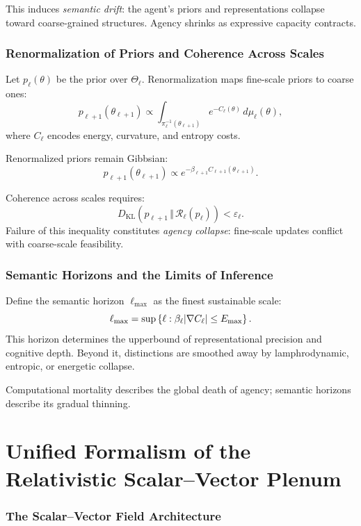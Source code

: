 \documentclass[12pt]{article}
\theoremstyle{plain}
\theoremstyle{definition}
\theoremstyle{remark}
\begin{document}
This induces \emph{semantic drift}: the agent's priors and representations 
collapse toward coarse-grained structures. Agency shrinks as expressive 
capacity contracts.

\section{Renormalization of Priors and Coherence Across Scales}

Let $p_\ell(\theta)$ be the prior over $\Theta_\ell$. Renormalization maps 
fine-scale priors to coarse ones:
\[
p_{\ell+1}(\theta_{\ell+1})
\propto
\int_{\pi_\ell^{-1}(\theta_{\ell+1})}
  e^{-C_\ell(\theta)}\, d\mu_\ell(\theta),
\]
where $C_\ell$ encodes energy, curvature, and entropy costs.

Renormalized priors remain Gibbsian:
\[
p_{\ell+1}(\theta_{\ell+1})
\propto
e^{-\beta_{\ell+1} C_{\ell+1}(\theta_{\ell+1})}.
\]

Coherence across scales requires:
\[
D_{\mathrm{KL}}(
  p_{\ell+1}
  \,\Vert\, 
  \mathcal{R}_\ell(p_\ell)
) < \varepsilon_\ell.
\]
Failure of this inequality constitutes \emph{agency collapse}: fine-scale 
updates conflict with coarse-scale feasibility.

\section{Semantic Horizons and the Limits of Inference}

Define the semantic horizon $\ell_{\max}$ as the finest sustainable scale:
\[
\ell_{\max}
= \sup\left\{
\ell : \beta_\ell \abs{\nabla C_\ell} \le E_{\max}
\right\}.
\]
This horizon determines the upperbound of representational precision and 
cognitive depth. Beyond it, distinctions are smoothed away by lamphrodynamic,
entropic, or energetic collapse.

Computational mortality describes the global death of agency; semantic 
horizons describe its gradual thinning.

\newpage

\part{Unified Formalism of the Relativistic Scalar--Vector Plenum}

\section{The Scalar--Vector Field Architecture}
\end{document}
